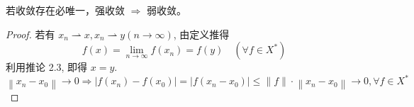 \documentclass[lang=cn,newtx,10pt,scheme=chinese,thmcnt=chapter]{elegantbook}
\begin{document}
\begin{proposition}
    若收敛存在必唯一，强收敛 $\Rightarrow$ 弱收敛。
\end{proposition}

\begin{proof}
若有 $x_n \rightharpoonup x, x_n \rightharpoonup y(n \rightarrow \infty)$, 由定义推得
\begin{equation*}
f(x)=\lim _{n \rightarrow \infty} f\left(x_n\right)=f(y) \quad\left(\forall f \in X ^*\right)
\end{equation*}
利用推论 2.3, 即得 $x=y$.
    \begin{equation*}
\left\|x_n-x_0\right\| \rightarrow 0 \Rightarrow\left|f\left(x_n\right)-f\left(x_0\right)\right|=\left|f\left(x_n-x_0\right)\right| \leqslant\|f\| \cdot\left\|x_n-x_0\right\| \rightarrow 0, \forall f \in X^*
\end{equation*}
\end{proof}
\end{document}
